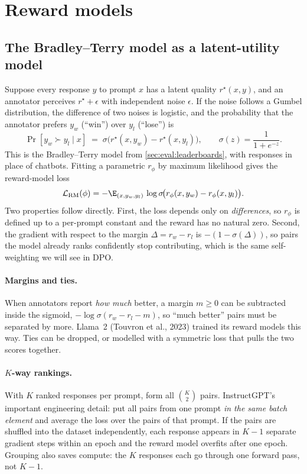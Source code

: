 \section{Reward models}\label{sec:rlhf:rm}

\subsection{The Bradley--Terry model as a latent-utility model}

Suppose every response $y$ to prompt $x$ has a latent quality $r^\star(x,y)$, and an annotator
perceives $r^\star + \epsilon$ with independent noise $\epsilon$. If the noise follows a Gumbel
distribution, the difference of two noises is logistic, and the probability that the annotator
prefers $y_w$ (``win'') over $y_l$ (``lose'') is
\begin{equation}
  \Pr[y_w \succ y_l \mid x] \;=\; \sigma\!\big(r^\star(x,y_w) - r^\star(x,y_l)\big),
  \qquad \sigma(z)=\frac{1}{1+e^{-z}}.
  \label{eq:rlhf:bt}
\end{equation}
This is the Bradley--Terry model from \cref{sec:eval:leaderboards}, with responses in place of
chatbots. Fitting a parametric $r_\phi$ by maximum likelihood gives the reward-model loss
\begin{equation}
  \mathcal{L}_{\text{RM}}(\phi) = -\E_{(x,y_w,y_l)}\,\log\sigma\!\big(r_\phi(x,y_w)-r_\phi(x,y_l)\big).
  \label{eq:rlhf:rmloss}
\end{equation}
Two properties follow directly. First, the loss depends only on \emph{differences}, so
$r_\phi$ is defined up to a per-prompt constant and the reward has no natural zero. Second, the
gradient with respect to the margin $\Delta = r_w - r_l$ is $-(1-\sigma(\Delta))$, so pairs the
model already ranks confidently stop contributing, which is the same self-weighting we will
see in DPO.

\paragraph{Margins and ties.} When annotators report \emph{how much} better, a margin
$m\ge 0$ can be subtracted inside the sigmoid, $-\log\sigma(r_w-r_l-m)$, so ``much better'' pairs
must be separated by more. Llama~2 (Touvron et al., 2023) trained its reward models this way.
Ties can be dropped, or modelled with a symmetric loss that pulls the two scores together.

\paragraph{$K$-way rankings.} With $K$ ranked responses per prompt, form all $\binom{K}{2}$ pairs.
InstructGPT's important engineering detail: put all pairs from one prompt \emph{in the same batch
element} and average the loss over the pairs of that prompt. If the pairs are shuffled into the
dataset independently, each response appears in $K-1$ separate gradient steps within an epoch and
the reward model overfits after one epoch. Grouping also saves compute: the $K$ responses each go
through one forward pass, not $K-1$.


